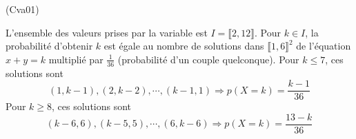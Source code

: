 \begin{tiny}(Cva01)\end{tiny} L'ensemble des valeurs prises par la variable est $I = \llbracket 2, 12\rrbracket$. Pour $k\in I$, la probabilité d'obtenir $k$ est égale au nombre de solutions dans $\llbracket 1,6\rrbracket^2$ de l'équation $x+y = k$ multiplié par $\frac{1}{36}$ (probabilité d'un couple quelconque).\newline
Pour $k\leq 7$, ces solutions sont 
\begin{displaymath}
  (1,k-1), (2,k-2),\cdots , (k-1,1) \Rightarrow p(X=k) = \frac{k-1}{36}
\end{displaymath}
Pour $k\geq 8$, ces solutions sont 
\begin{displaymath}
  (k-6,6), (k-5,5),\cdots , (6,k-6) \Rightarrow p(X=k) = \frac{13-k}{36}
\end{displaymath}
